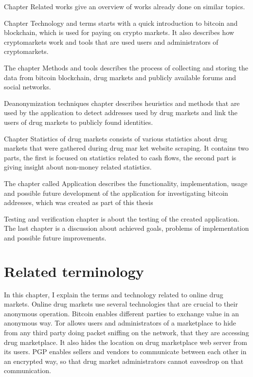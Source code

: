 \documentclass[
  digital, %
  table,   %
  lof,     %
  lot,     %
  oneside
]{fithesis3}
\begin{document}
Chapter Related works give an overview of works already done on similar topics. 

Chapter Technology and terms starts with a quick introduction to bitcoin and blockchain,
which is used for paying on crypto markets.
It also describes how cryptomarkets work and tools that are used users and administrators of cryptomarkets.

The chapter Methods and tools describes the process of collecting and storing the data from bitcoin blockchain,
drug markets and publicly available forums and social networks. 

Deanonymization techniques chapter describes heuristics and methods that are used by the application to detect 
addresses used by drug markets and link the users of drug markets to publicly found identities.

Chapter Statistics of drug markets consists of various statistics about drug markets that were gathered during drug mar
ket website scraping.
It contains two parts, the first is focused on statistics related to cash flows, the second part is giving insight about
 non-money related statistics.

The chapter called Application describes the functionality, implementation, usage and 
possible future development of the application for investigating bitcoin addresses, which was created as part of this thesis

Testing and verification chapter is about the testing of the created application.
The last chapter is a discussion about achieved goals, problems of implementation and possible future improvements.

\chapter{Related terminology}

In this chapter, I explain the terms and technology related to online drug markets.
Online drug markets use several technologies that are crucial to their anonymous operation.
Bitcoin enables different parties to exchange value in an anonymous way.
Tor allows users and administrators of a marketplace to hide from any third party doing packet sniffing on the network,
that they are accessing drug marketplace. It also hides the location on drug marketplace web server from its users.
PGP enables sellers and vendors to communicate between each other in an encrypted way,
so that drug market administrators cannot eavesdrop on that communication.
\end{document}
